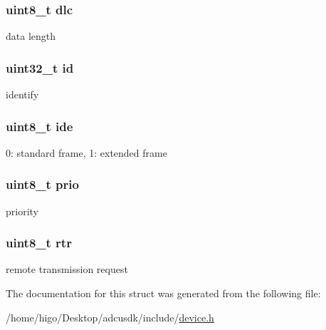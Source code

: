 \subsubsection[{\texorpdfstring{dlc}{dlc}}]{\setlength{\rightskip}{0pt plus 5cm}uint8\+\_\+t dlc}\hypertarget{structp__adcuCanData_a19defed5d87587252d55e15cf3d5432d}{}\label{structp__adcuCanData_a19defed5d87587252d55e15cf3d5432d}
data length 
\subsubsection[{\texorpdfstring{id}{id}}]{\setlength{\rightskip}{0pt plus 5cm}uint32\+\_\+t id}\hypertarget{structp__adcuCanData_abaabdc509cdaba7df9f56c6c76f3ae19}{}\label{structp__adcuCanData_abaabdc509cdaba7df9f56c6c76f3ae19}
identify 
\subsubsection[{\texorpdfstring{ide}{ide}}]{\setlength{\rightskip}{0pt plus 5cm}uint8\+\_\+t ide}\hypertarget{structp__adcuCanData_aa9dce2f3e5db51ea2a5d0ea09bab7e66}{}\label{structp__adcuCanData_aa9dce2f3e5db51ea2a5d0ea09bab7e66}
0\+: standard frame, 1\+: extended frame 
\subsubsection[{\texorpdfstring{prio}{prio}}]{\setlength{\rightskip}{0pt plus 5cm}uint8\+\_\+t prio}\hypertarget{structp__adcuCanData_acc0b27a6740f03639727be452f1e6b83}{}\label{structp__adcuCanData_acc0b27a6740f03639727be452f1e6b83}
priority 
\subsubsection[{\texorpdfstring{rtr}{rtr}}]{\setlength{\rightskip}{0pt plus 5cm}uint8\+\_\+t rtr}\hypertarget{structp__adcuCanData_a7be9c2d0472674ddfd4e8c1ce2e460c4}{}\label{structp__adcuCanData_a7be9c2d0472674ddfd4e8c1ce2e460c4}
remote transmission request 

The documentation for this struct was generated from the following file\+:\begin{DoxyCompactItemize}
\item 
/home/higo/\+Desktop/adcusdk/include/\hyperlink{device_8h}{device.\+h}\end{DoxyCompactItemize}
